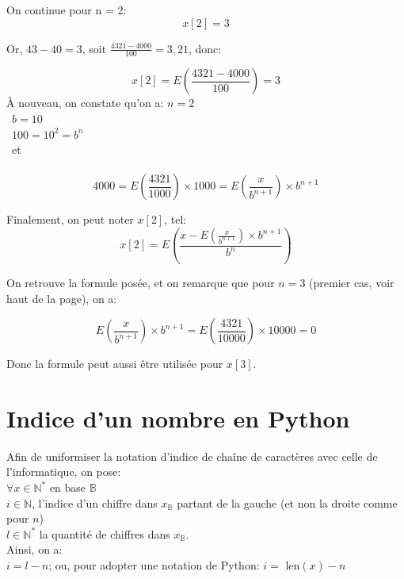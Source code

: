 \documentclass[a4paper, 12pt]{article}
\begin{document}
On continue pour n = 2:
\begin{equation}
x[2] = 3
\end{equation}

Or, $43 - 40 = 3$, soit $\frac{4321 - 4000}{100} = 3,21$, donc:

\begin{equation}
x[2] = E \left( \frac{4321 - 4000}{100} \right) = 3
\end{equation}
À nouveau, on constate qu'on a:
$n = 2$ \\\
$b = 10$ \\\
$100 = 10^2 = b^{n}$ \\\
et \\\
\begin{equation}
4000 = E \left( \frac{4321}{1000} \right) \times 1000 = E \left( \frac{x}{b^{n+1}} \right) \times b^{n+1}
\end{equation}

Finalement, on peut noter $x[2]$, tel:
\begin{equation}
x[2] = E \left( \frac{x - E \left( \frac{x}{b^{n+1}} \right) \times b^{n+1}}{b^{n}} \right)
\end{equation}

On retrouve la formule posée, et on remarque que pour $n = 3$ (premier cas, voir haut de la page), on a:

\begin{equation}
E \left( \frac{x}{b^{n+1}} \right) \times b^{n+1} = E \left( \frac{4321}{10000} \right) \times 10000 = 0
\end{equation}

Donc la formule peut aussi être utilisée pour $x[3]$.

\section*{Indice d'un nombre en Python}
Afin de uniformiser la notation d'indice de chaîne de caractères avec celle de l'informatique, on pose: \\
$\forall x \in \mathbb{N}^{*}$ en base $\mathbb{B}$ \\
$i \in \mathbb{N}$, l'indice d'un chiffre dans $x_\mathbb{B}$ partant de la gauche (et non la droite comme pour $n$) \\
$l \in \mathbb{N}^{*}$ la quantité de chiffres dans $x_\mathbb{B}$. \\


Ainsi, on a: \\
$i = l - n$; ou, pour adopter une notation de Python: $i = $ len$(x) - n$
\end{document}
